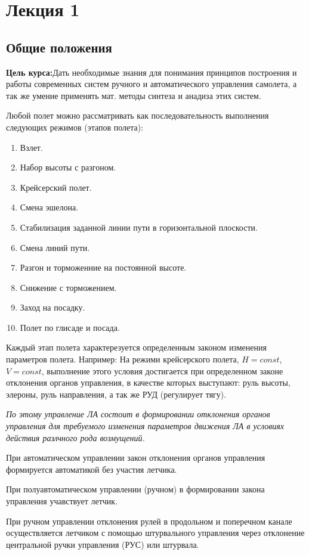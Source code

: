 \documentclass{article}
\begin{document}
\thispagestyle{empty}
\tableofcontents
\section{Лекция 1}
\subsection{Общие положения}
\textbf{Цель курса:}Дать необходимые знания для понимания принципов построения и работы современных систем ручного и автоматического управления самолета, а так же умение применять мат. методы синтеза и анадиза этих систем.

Любой полет можно рассматривать как последовательность выполнения следующих режимов (этапов полета):
\begin{enumerate}
	\item Взлет.
	\item Набор высоты с разгоном.
	\item Крейсерский полет.
	\item Смена эшелона.
	\item Стабилизация заданной линии пути в горизонтальной плоскости.
	\item Смена линий пути.
	\item Разгон и торможенние на постоянной высоте.
	\item Снижение с торможением.
	\item Заход на посадку.
	\item Полет по глисаде и посада.
\end{enumerate}

Каждый этап полета характерезуется определенным законом изменения параметров полета. Например: На режими крейсерского полета, $H=const$, $V=const$, выполнение этого условия достигается при определенном законе отклонения органов управления, в качестве которых выступают: руль высоты, элероны, руль направления, а так же РУД (регулирует тягу).
\begin{flushright} 
	\textit{
		По этому управление ЛА состоит в формировании отклонения органов управления для требуемого изменения параметров движения ЛА в условиях действия разлчного рода возмущений.}
\end{flushright}
При автоматическом управлении закон отклонения органов управления формируется автоматикой без участия летчика.

При полуавтоматическом управлении (ручном) в формировании закона управления учавствует летчик.

При ручном управлении отклонения рулей в продольном и поперечном канале осуществляется летчиком с помощью штурвального управления через отклонение центральной ручки управления (РУС) или штурвала.
\end{document}
